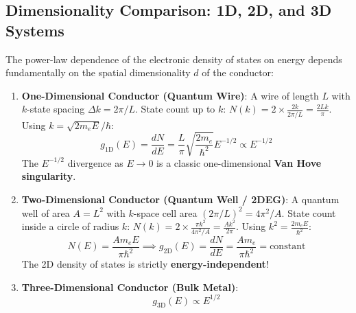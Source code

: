 \documentclass[11pt,a4paper]{article}
\begin{document}
\subsection{Dimensionality Comparison: 1D, 2D, and 3D Systems}
The power-law dependence of the electronic density of states on energy depends fundamentally on the spatial dimensionality $d$ of the conductor:
\begin{enumerate}[leftmargin=*]
    \item \textbf{One-Dimensional Conductor (Quantum Wire)}: A wire of length $L$ with $k$-state spacing $\Delta k = 2\pi/L$. State count up to $k$: $N(k) = 2 \times \frac{2k}{2\pi/L} = \frac{2Lk}{\pi}$.
    Using $k = \sqrt{2m_e E}/\hbar$:
    \begin{equation}
    g_{\mathrm{1D}}(E) = \frac{dN}{dE} = \frac{L}{\pi}\sqrt{\frac{2m_e}{\hbar^2}}E^{-1/2} \propto E^{-1/2}
    \label{eq:1d_dos}
    \end{equation}
    The $E^{-1/2}$ divergence as $E \to 0$ is a classic one-dimensional \textbf{Van Hove singularity}.
    \item \textbf{Two-Dimensional Conductor (Quantum Well / 2DEG)}: A quantum well of area $A = L^2$ with $k$-space cell area $(2\pi/L)^2 = 4\pi^2/A$. State count inside a circle of radius $k$:
    $N(k) = 2 \times \frac{\pi k^2}{4\pi^2/A} = \frac{A k^2}{2\pi}$.
    Using $k^2 = \frac{2m_e E}{\hbar^2}$:
    \begin{equation}
    N(E) = \frac{A m_e E}{\pi\hbar^2} \implies \boxed{g_{\mathrm{2D}}(E) = \frac{dN}{dE} = \frac{A m_e}{\pi\hbar^2} = \mathrm{constant}}
    \label{eq:2d_dos}
    \end{equation}
    The 2D density of states is strictly \textbf{energy-independent}!
    \item \textbf{Three-Dimensional Conductor (Bulk Metal)}:
    \begin{equation}
    g_{\mathrm{3D}}(E) \propto E^{1/2}
    \end{equation}
\end{enumerate}
\end{document}
